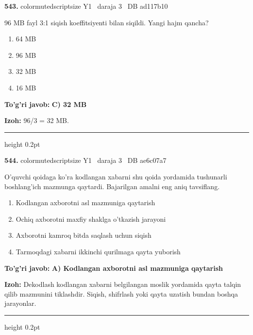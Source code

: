 \documentclass[10pt,a4paper,oneside]{article}
\begin{document}
\noindent\textbf{\color{ink}543.}  {color{muted}scriptsize Y1 \textbullet\ daraja 3 \textbullet\ DB ad117b10}
\par
96 MB fayl 3:1 siqish koeffitsiyenti bilan siqildi. Yangi hajm qancha?
\begin{enumerate}[label=\Alph*),leftmargin=9mm]
\item 64 MB
\item 96 MB
\item 32 MB
\item 16 MB
\end{enumerate}
\begin{tcolorbox}[enhanced,breakable,colback=teal!4,colframe=teal!50!black,boxrule=0.5pt,arc=1.1mm,left=3mm,right=3mm,top=1.7mm,bottom=1.7mm,before skip=2mm,after skip=2mm]
\textbf{\color{teal}To'g'ri javob:} \textbf{C) 32 MB}
\par\smallskip
\textbf{Izoh:} 96/3 = 32 MB.
\end{tcolorbox}
\vspace{2mm}\hrule height 0.2pt \vspace{3mm}

\noindent\textbf{\color{ink}544.}  {color{muted}scriptsize Y1 \textbullet\ daraja 3 \textbullet\ DB ae6c07a7}
\par
O'quvchi qoidaga ko'ra kodlangan xabarni shu qoida yordamida tushunarli boshlang'ich mazmunga qaytardi. Bajarilgan amalni eng aniq tavsiflang.
\begin{enumerate}[label=\Alph*),leftmargin=9mm]
\item Kodlangan axborotni asl mazmuniga qaytarish
\item Ochiq axborotni maxfiy shaklga o'tkazish jarayoni
\item Axborotni kamroq bitda saqlash uchun siqish
\item Tarmoqdagi xabarni ikkinchi qurilmaga qayta yuborish
\end{enumerate}
\begin{tcolorbox}[enhanced,breakable,colback=teal!4,colframe=teal!50!black,boxrule=0.5pt,arc=1.1mm,left=3mm,right=3mm,top=1.7mm,bottom=1.7mm,before skip=2mm,after skip=2mm]
\textbf{\color{teal}To'g'ri javob:} \textbf{A) Kodlangan axborotni asl mazmuniga qaytarish}
\par\smallskip
\textbf{Izoh:} Dekodlash kodlangan xabarni belgilangan moslik yordamida qayta talqin qilib mazmunini tiklashdir. Siqish, shifrlash yoki qayta uzatish bundan boshqa jarayonlar.
\end{tcolorbox}
\vspace{2mm}\hrule height 0.2pt \vspace{3mm}
\end{document}
